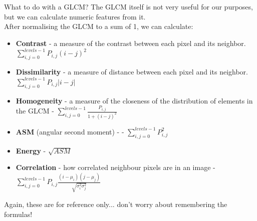 \documentclass[9pt, aspectratio=169]{beamer}
\begin{document}
\begin{frame}
    {What to do with a GLCM?}
    The GLCM itself is not very useful for our purposes, but we can calculate numeric features from it.\\

    After normalising the GLCM to a sum of 1, we can calculate:

    \begin{itemize}
        \item \textbf{Contrast} - a measure of the contrast between each pixel and its neighbor. \Large $\sum_{i,j=0}^{levels-1}P_{i,j}(i-j)^2$
        \item \normalsize \textbf{Dissimilarity} - a measure of distance between each pixel and its neighbor. \Large $\sum_{i,j=0}^{levels-1}P_{i,j}|i-j|$
        \item \normalsize \textbf{Homogeneity} - a measure of the closeness of the distribution of elements in the GLCM - \Large$\sum_{i,j=0}^{levels-1}\frac{P_{i,j}}{1+(i-j)^2}$
        \item \normalsize \textbf{ASM} (angular second moment) -  - \Large $\sum_{i,j=0}^{levels-1}P_{i,j}^2$
        \item \normalsize \textbf{Energy} - $\sqrt{ASM}$
        \item \normalsize \textbf{Correlation} - how correlated neighbour pixels are in an image - \Large $\sum_{i,j=0}^{levels-1}P_{i,j}\frac{(i-\mu_i)(j-\mu_j)}{\sqrt{\sigma_i^2\sigma_j^2}}$
    \end{itemize}

    Again, these are for reference only... don't worry about remembering the formulas!
\end{frame}
\end{document}
